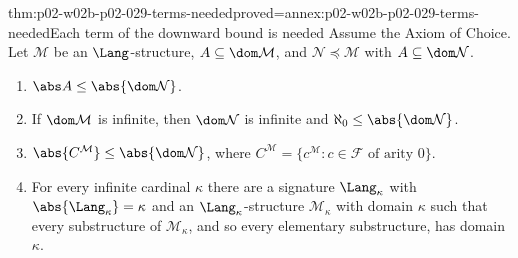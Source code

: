 \begin{hblemma}{thm:p02-w02b-p02-029-terms-needed}{proved=annex:p02-w02b-p02-029-terms-needed}{Each term of the downward bound is needed}
Assume the Axiom of Choice. Let \(\mathcal M\) be an \(\Lang\)-structure,
\(A\subseteq\dom\mathcal M\), and \(\mathcal N\preccurlyeq\mathcal M\) with
\(A\subseteq\dom\mathcal N\).
\begin{enumerate}
  \item \(\abs A\leq\abs{\dom\mathcal N}\).
  \item If \(\dom\mathcal M\) is infinite, then \(\dom\mathcal N\) is
        infinite and \(\aleph_0\leq\abs{\dom\mathcal N}\).
  \item \(\abs{C^{\mathcal M}}\leq\abs{\dom\mathcal N}\), where
        \(C^{\mathcal M}=\{c^{\mathcal M}:c\in\mathcal F\text{ of arity }0\}\).
  \item For every infinite cardinal \(\kappa\) there are a signature
        \(\Lang_\kappa\) with \(\abs{\Lang_\kappa}=\kappa\) and an
        \(\Lang_\kappa\)-structure \(\mathcal M_\kappa\) with domain
        \(\kappa\) such that every substructure of \(\mathcal M_\kappa\), and
        so every elementary substructure, has domain \(\kappa\).
\end{enumerate}
\end{hblemma}

